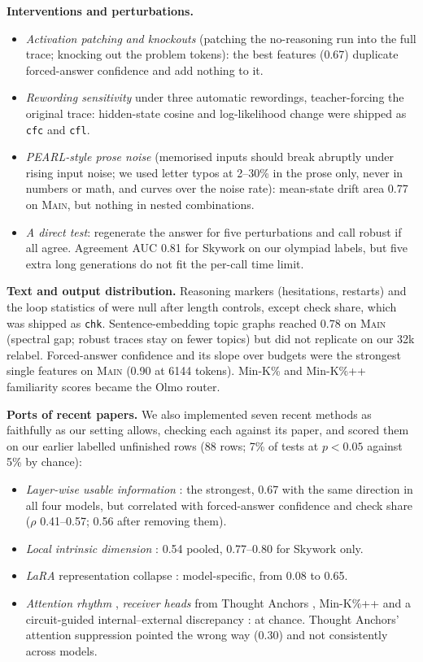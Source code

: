 \documentclass{article}
\begin{document}
\textbf{Interventions and perturbations.}
\begin{itemize}
\item \emph{Activation patching} \citep{meng2022rome} \emph{and knockouts} (patching the no-reasoning run into the full trace; knocking out the problem tokens): the best features (0.67) duplicate forced-answer confidence and add nothing to it.
\item \emph{Rewording sensitivity} under three automatic rewordings, teacher-forcing the original trace: hidden-state cosine and log-likelihood change were shipped as \texttt{cfc} and \texttt{cfl}.
\item \emph{PEARL-style prose noise} \citep{djire2025pearl} (memorised inputs should break abruptly under rising input noise; we used letter typos at 2--30\% in the prose only, never in numbers or math, and curves over the noise rate): mean-state drift area 0.77 on \textsc{Main}, but nothing in nested combinations.
\item \emph{A direct test}: regenerate the answer for five perturbations and call robust if all agree. Agreement AUC 0.81 for Skywork on our olympiad labels, but five extra long generations do not fit the per-call time limit.
\end{itemize}

\textbf{Text and output distribution.} Reasoning markers (hesitations, restarts) and the loop statistics of \citet{duan2026loops} were null after length controls, except check share, which was shipped as \texttt{chk}. Sentence-embedding \citep{reimers2019sbert} topic graphs reached 0.78 on \textsc{Main} (spectral gap; robust traces stay on fewer topics) but did not replicate on our 32k relabel. Forced-answer confidence and its slope over budgets were the strongest single features on \textsc{Main} (0.90 at 6144 tokens). Min-K\% and Min-K\%++ \citep{shi2024mink,zhang2025minkpp} familiarity scores became the Olmo router.

\textbf{Ports of recent papers.} We also implemented seven recent methods as faithfully as our setting allows, checking each against its paper, and scored them on our earlier labelled unfinished rows (88 rows; 7\% of tests at $p<0.05$ against 5\% by chance):
\begin{itemize}
\item \emph{Layer-wise usable information} \citep{kim2024layerinfo}: the strongest, 0.67 with the same direction in all four models, but correlated with forced-answer confidence and check share ($\rho$ 0.41--0.57; 0.56 after removing them).
\item \emph{Local intrinsic dimension} \citep{yin2024lid}: 0.54 pooled, 0.77--0.80 for Skywork only.
\item \emph{LaRA} representation collapse \citep{gwak2026lara}: model-specific, from 0.08 to 0.65.
\item \emph{Attention rhythm} \citep{li2025rhythm}, \emph{receiver heads} from Thought Anchors \citep{bogdan2025anchors}, Min-K\%++ \citep{zhang2025minkpp} and a circuit-guided internal--external discrepancy \citep{shen2026cie}: at chance. Thought Anchors' attention suppression pointed the wrong way (0.30) and not consistently across models.
\end{itemize}
\end{document}
